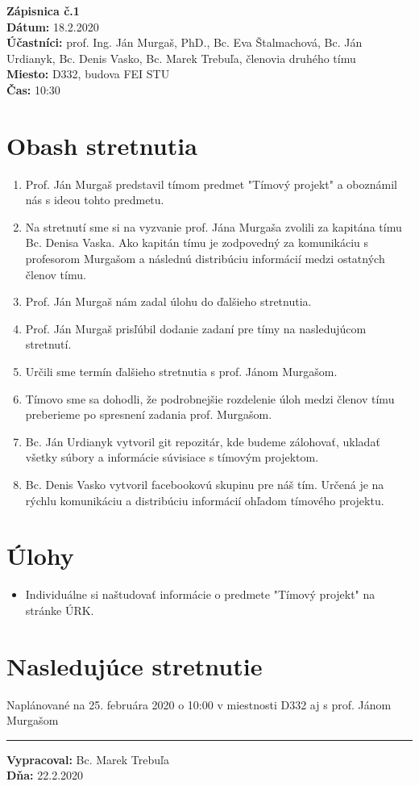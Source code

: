 
\usepackage{parskip}%

	\textbf{{\Huge Zápisnica č.1}}\\
			
	\textbf{Dátum:} 18.2.2020\\	
		
	\textbf{Účastníci:} prof. Ing. Ján Murgaš, PhD., Bc. Eva Štalmachová, Bc. Ján Urdianyk, Bc. Denis Vasko, Bc. Marek Trebuľa, členovia druhého tímu\\
		
	\textbf{Miesto:} D332, budova FEI STU\\	
	
	\textbf{Čas:} 10:30    
    \section*{Obash stretnutia}
    \begin{enumerate}
    	\item Prof. Ján Murgaš predstavil tímom predmet "Tímový projekt" a oboznámil nás s ideou tohto predmetu.
    	\item Na stretnutí sme si na vyzvanie prof. Jána Murgaša zvolili za kapitána tímu Bc. Denisa Vaska. Ako kapitán tímu je zodpovedný za komunikáciu s profesorom Murgašom a následnú distribúciu informácií medzi ostatných členov tímu.
    	\item Prof. Ján Murgaš nám zadal úlohu do ďalšieho stretnutia.
    	\item Prof. Ján Murgaš prisľúbil dodanie zadaní pre tímy na nasledujúcom\\ stretnutí.
    	\item Určili sme termín ďalšieho stretnutia s prof. Jánom Murgašom.
    	\item Tímovo sme sa dohodli, že podrobnejšie rozdelenie úloh medzi členov tímu preberieme po spresnení zadania prof. Murgašom.
    	\item Bc. Ján Urdianyk vytvoril git repozitár, kde budeme zálohovať, ukladať všetky súbory a informácie súvisiace s tímovým projektom.
    	\item  Bc. Denis Vasko vytvoril facebookovú skupinu pre náš tím. Určená je na rýchlu komunikáciu a distribúciu informácií ohľadom tímového projektu.
    \end{enumerate}    
    \section*{Úlohy}
    \begin{itemize}
    	\item Individuálne si naštudovať informácie o predmete "Tímový projekt" na stránke ÚRK.
    \end{itemize}

    \section*{Nasledujúce stretnutie}
    Naplánované na 25. februára 2020 o 10:00 v miestnosti D332 aj s prof. Jánom Murgašom
    
    \noindent\rule{15cm}{0.4pt}
   {\small 	\textbf{Vypracoval:} Bc. Marek Trebuľa\\
   \textbf{Dňa:} 22.2.2020 }
    


